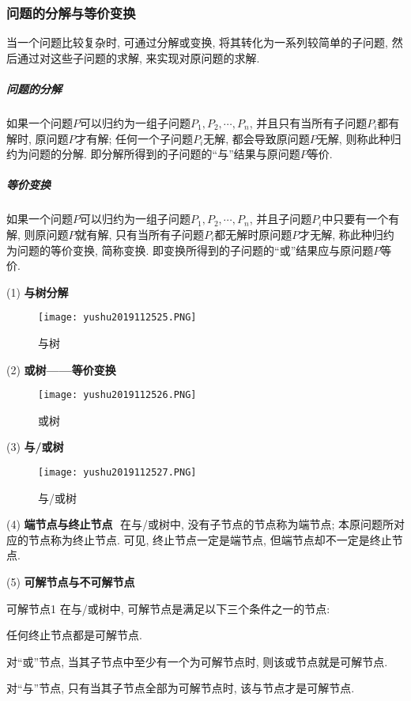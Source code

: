 \subsubsection{问题的分解与等价变换}
当一个问题比较复杂时, 可通过分解或变换, 将其转化为一系列较简单的子问题, 然后通过对这些子问题的求解, 来实现对原问题的求解.
\subparagraph{问题的分解}
如果一个问题$P$可以归约为一组子问题$P_1,P_2,\cdots,P_n$, 并且只有当所有子问题$P_i$都有解时, 原问题$P$才有解; 任何一个子问题$P_i$无解, 都会导致原问题$P$无解, 则称此种归约为问题的分解.
即分解所得到的子问题的“与”结果与原问题$P$等价.
\subparagraph{等价变换}
如果一个问题$P$可以归约为一组子问题$P_1,P_2,\cdots,P_n$, 并且子问题$P_i$中只要有一个有解, 则原问题$P$就有解, 只有当所有子问题$P_i$都无解时原问题$P$才无解, 称此种归约为问题的等价变换, 简称变换.
即变换所得到的子问题的“或”结果应与原问题$P$等价.

(1) \textbf{与树分解}
\begin{figure}[H]
\centering
\texttt{[image: yushu2019112525.PNG]}
\caption{与树 }
\label{AI32fig25}
\end{figure}

(2) \textbf{或树——等价变换}
\begin{figure}[H]
    \centering
    \texttt{[image: yushu2019112526.PNG]}
    \caption{或树 }
    \label{AI32fig26}
\end{figure}

(3) \textbf{与/或树}
\begin{figure}[H]
    \centering
    \texttt{[image: yushu2019112527.PNG]}
    \caption{与/或树 }
    \label{AI32fig27}
\end{figure}
(4) \textbf{端节点与终止节点}\,\, 在与/或树中, 没有子节点的节点称为端节点; 本原问题所对应的节点称为终止节点. 可见, 终止节点一定是端节点, 但端节点却不一定是终止节点.

(5) \textbf{可解节点与不可解节点}
\begin{mydef}{可解节点}{1}
在与/或树中, 可解节点是满足以下三个条件之一的节点:

 任何终止节点都是可解节点.

 对“或”节点, 当其子节点中至少有一个为可解节点时, 则该或节点就是可解节点.

 对“与”节点, 只有当其子节点全部为可解节点时, 该与节点才是可解节点.
\end{mydef}

